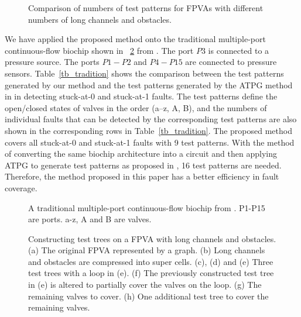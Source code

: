 \begin{figure}[t]
{\figurefontsize
\centering
\vskip 10pt
%
\caption{Comparison of numbers of test patterns for FPVAs with different numbers of long channels and obstacles.}
\label{fig:wall_hole_test}
}
\end{figure}

We have applied the proposed method onto the traditional multiple-port
continuous-flow biochip shown 
in \figname~\ref{fig:test_traditional} from \cite{HuYHC14}. The port $P3$
is connected to a pressure source. The ports $P1-P2$ and $P4-P15$ are connected
to pressure sensors. 
Table~\ref{tb_tradition} shows the comparison between the test patterns generated by our
method and the test patterns generated by the ATPG method in \cite{HuYHC14} in
detecting stuck-at-0 and stuck-at-1 faults.
The test patterns define the open/closed states
of valves in the order (a--z, A, B), and the numbers of
individual faults that can be detected by the corresponding test patterns are
also shown in the corresponding rows in Table~\ref{tb_tradition}.
The proposed method covers all stuck-at-0 and stuck-at-1 faults with 9 test patterns. 
With the method of converting the same biochip architecture into a circuit 
and then applying ATPG to generate test patterns as proposed in \cite{HuYHC14}, 
16 test patterns are needed. Therefore, the method proposed in this paper has a
better efficiency in fault coverage. 


 \begin{figure}[t]
 {\figurefontsize
 \centering
 
 \caption{A traditional multiple-port continuous-flow biochip from \cite{HuYHC14}. P1-P15 are ports. a-z, A and B are valves.}
 \label{fig:test_traditional}
 }
 \end{figure}

\begin{figure*}
{\figurefontsize
\centering

\caption{Constructing test trees on a  FPVA with long channels and obstacles. (a) The original FPVA represented by a graph. (b) Long channels and obstacles are compressed into super cells. (c), (d) and (e) Three test trees with a loop in (e).  (f) The previously constructed test tree in (e) is altered to partially cover the valves on the loop. (g) The remaining valves to cover. (h) One additional test tree to cover the remaining valves.}
\label{fig:kill_loops_example}
}
\end{figure*}
 
